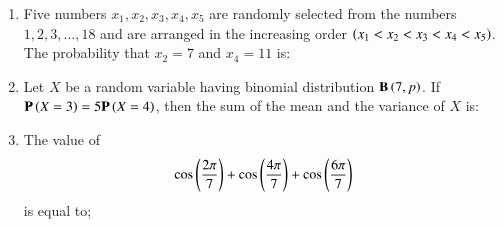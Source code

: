 \documentclass[journal]{IEEEtran}
\numberwithin{equation}{enumi}
\numberwithin{figure}{enumi}
\begin{document}
\begin{enumerate}
    
    \item 
    Five numbers $x_1, x_2, x_3, x_4, x_5$ are randomly selected from the numbers $1, 2, 3,\dots, 18$ and are arranged in the increasing order $\left(x_1 < x_2 < x_3 < x_4 < x_5\right)$. The probability that $x_2 = 7$ and $x_4 = 11$ is:

    \hfill{}
    
    \begin{enumerate}
    \end{enumerate}

    \item 
    Let $X$ be a random variable having binomial distribution $\mathbf{B}\left(7, p\right)$. If $\mathbf{P}\left(X = 3\right) = 5\mathbf{P}\left(X = 4\right)$, then the sum of the mean and the variance of $X$ is: 

    \hfill{}
    
    \begin{enumerate}
    \end{enumerate}

    \item 
    The value of 
    \begin{align*}
        \cos{\ensuremath{\left(\frac{2\pi}{7}\right)}} + \cos{\ensuremath{\left(\frac{4\pi}{7}\right)}} + \cos{\ensuremath{\left(\frac{6\pi}{7}\right)}} 
    \end{align*}
    is equal to;

    \hfill{}
    
    \begin{enumerate}
    \end{enumerate}


\end{enumerate}
\end{document}
